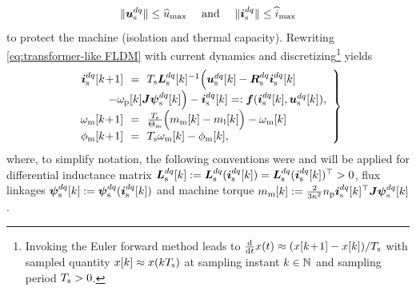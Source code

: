 \documentclass[journal]{IEEEtranTIE}
\begin{document}
%
\begin{equation}
\norm{\usdq} \leq \usmax \quad \text{ and \quad } \norm{\isdq} \leq \ismax 
\label{eq:voltage and current constraints}
\end{equation}
%
to protect the machine (isolation and thermal capacity).
Rewriting \eqref{eq:transformer-like FLDM} with current dynamics and discretizing\footnote{Invoking the Euler forward method leads to $\tfrac{\mathrm{d}}{\mathrm{d}t} x(t) \approx (x[k\!+\!1] - x[k])/T_{\mathrm{s}}$ with sampled quantity $x[k]\approx x(kT_{\mathrm{s}})$ at sampling instant $k\in \mathbb{N}$ and sampling period $T_{\mathrm{s}}>0$.} yields
%
\begin{equation}
	\left.
	\begin{array}{rcl}
		\isdq[k\!+\!1] &\!\!=\!\!& \Ts\Lsdq[k]^{-1} \Big(\usdq[k] - \Rsdq\isdq[k] \\ 
& & \hspace{-8ex} - \omegaP[k]\J\psisdq[k]  \Big) - \isdq[k] =: \mv{f}(\isdq[k],\usdq[k]) ,  \\
        \omegaM[k\!+\!1] &\!\!=\!\!& \tfrac{\Ts}{\ThetaM}\Big( \mM[k]  - \mL[k] \Big) - \omegaM[k] \\
        \phiM[k\!+\!1] &\!\!=\!\!& \Ts \omegaM[k] - \phiM[k],
	\end{array}
	\right\}
	\label{eq:transformer-like CDM (discrete)}
\end{equation}
%
where, to simplify notation, the following conventions were and will be applied for differential inductance matrix $\boldsymbol{L}_{\mathrm{s}}^{dq}[k]:=\boldsymbol{L}_{\mathrm{s}}^{dq}(\boldsymbol{i}_{\mathrm{s}}^{dq}[k])=\boldsymbol{L}_{\mathrm{s}}^{dq}(\boldsymbol{i}_{\mathrm{s}}^{dq}[k])^\top>0$,  flux linkages $\boldsymbol{\psi}_{\mathrm{s}}^{dq}[k]:=\boldsymbol{\psi}_{\mathrm{s}}^{dq}(\boldsymbol{i}_{\mathrm{s}}^{dq}[k])$ and machine torque $m_{\mathrm{m}}[k]:= \tfrac{2}{3\kappa^2}n_{\mathrm{p}} \boldsymbol{i}_{\mathrm{s}}^{dq}[k]^\top\boldsymbol{J} \boldsymbol{\psi}_{\mathrm{s}}^{dq}[k]$.
%
\end{document}
